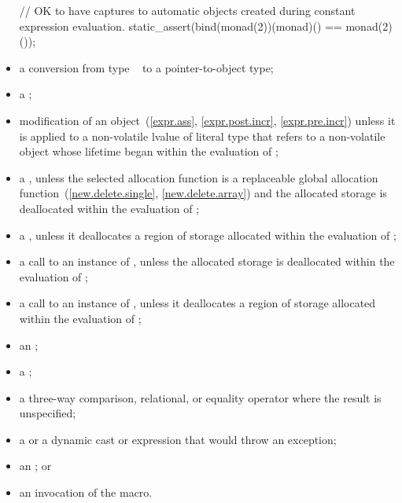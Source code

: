 \begin{itemize}
\begin{note}
\begin{example}
\begin{codeblock}
// OK to have captures to automatic objects created during constant expression evaluation.
static_assert(bind(monad(2))(monad)() == monad(2)());
\end{codeblock}
\end{example}
\end{note}

\item
a conversion from type \cv{}~ to a pointer-to-object type;

\item
a ;

\item
modification of an object~(\ref{expr.ass}, \ref{expr.post.incr},
\ref{expr.pre.incr})
unless it is applied to a non-volatile lvalue of literal type
that refers to a non-volatile object
whose lifetime began within the evaluation of ;

\item
a ,
unless the selected allocation function is
a replaceable global allocation function~(\ref{new.delete.single},
\ref{new.delete.array}) and
the allocated storage is deallocated within the evaluation of ;

\item
a ,
unless it deallocates a region of storage
allocated within the evaluation of ;

\item
a call to an instance of
,
unless the allocated storage is deallocated within the evaluation of ;

\item
a call to an instance of
,
unless it deallocates a region of storage
allocated within the evaluation of ;

\item
an ;

\item
a ;

\item
a three-way comparison,
relational, or equality
operator where the result is unspecified;

\item
a  or
a dynamic cast or  expression
that would throw an exception;

\item
an ; or

\item
an invocation of the  macro.
\end{itemize}

